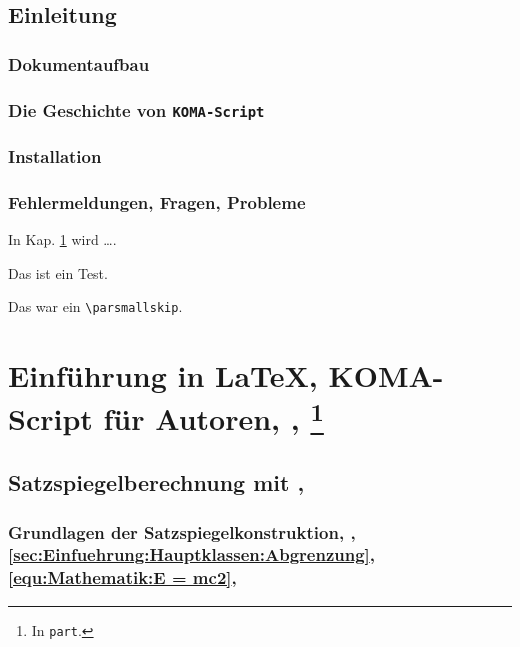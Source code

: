 \chapter{Einleitung}
\label{chap:Einleitung}
\section{Dokumentaufbau}
\label{sec:Einleitung:Dokumentaufbau}
\lipsum[1-2]
\section{Die Geschichte von \texttt{KOMA-Script}}
\label{sec:Einleitung:Geschichte}
\lipsum[1-2]
\section{Installation}
\label{sec:Einleitung:Installation}
\lipsum[1-2]
\section{Fehlermeldungen, Fragen, Probleme}
\label{sec:Einleitung:Fehlermeldung, Frage, Probleme}
In Kap. \ref{chap:Einleitung} wird \ldots{}.\par%
Das ist ein Test.\par\smallskip
Das war ein \verb|\parsmallskip|.
\lipsum[1-2]
\lipsum[1-3]
\lipsum[1-4]


\part[Einführung in \LaTeX{}, KOMA-Script für Autoren\texorpdfstring{, \cite{LabenbacherTeX}}{}]{Einführung in \LaTeX{}, KOMA-Script für Autoren\texorpdfstring{, \cite{LabenbacherTeX}, \protect\footnote{In \texttt{part}.}}{}}%
\label{part:Einfuehrung in LaTeX, KOMA-Script fuer Autoren, scrbook}%
\chapter[Satzspiegelberechnung mit \texorpdfstring{\TUMstyle{package}{typearea.sty}}{typearea.sty}]{Satzspiegelberechnung mit \texorpdfstring{, \protect\footnotemark{}}{}}%
\label{chap:Einfuehrung:Satzspiegelberechnung}%
\section[Grundlagen der Satzspiegelkonstruktion]{Grundlagen der Satzspiegelkonstruktion\texorpdfstring{, \cite{LabenbacherTeX}, \ref{sec:Einfuehrung:Hauptklassen:Abgrenzung}, \eqref{equ:Mathematik:E = mc2}}{}\texorpdfstring{, \protect\mbox{\footnotemark}}{}}%
\label{sec:Einfuehrung:Satzspiegelberechnung:Grundlagen}%
